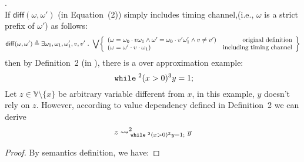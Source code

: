 %
\clearpage
\begin{example}.
\\
If $\mathsf{diff}(\omega, \omega')$ (in \cite{cousot2019abstract} Equation~(2)) simply includes timing channel,(i.e., $\omega$ is a strict prefix of $\omega'$) as follows:
\[
	\mathsf{diff}(\omega, \omega') \triangleq \exists \omega_0, \omega_1, \omega_1', v, v' 
	\st \bigvee \left\{
	\begin{array}{lr}
	(\omega = \omega_0 \cdot v \omega_1
		\land \omega' = \omega_0 \cdot v' \omega_1' \land v \neq v') & \mbox{original definition} \\
	(\omega = \omega' \cdot v \cdot \omega_1) & \mbox{including timing channel} \\
	\end{array}
	\right\}
\] 
then by Definition~2 (in \cite{cousot2019abstract}), there is a over approximation example:
\[
	\;\mathtt{while}\; {}^2 (x > 0) {}^3 y = 1; 
\]
Let $z \in \mathbb{V}\setminus \{x\}$ be arbitrary variable different from $x$,
in this example, $y$ doesn't rely on $z$. 
However, according to value dependency defined in Definition~2 \cite{cousot2019abstract} we can derive 
\[
	z \rightsquigarrow^{2}_{\;\mathtt{while}\; {}^2 (x > 0) {}^3 y = 1;} y
\]
%
\begin{proof}
By semantics definition, we have:
%
%
\end{proof}
\end{example}
%
